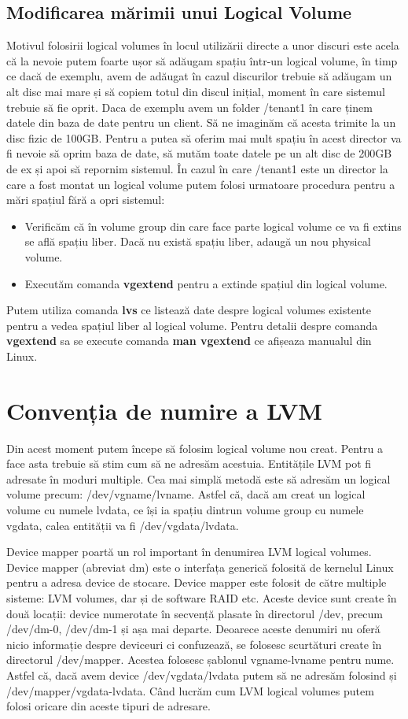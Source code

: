 \subsection{Modificarea mărimii unui Logical Volume}
Motivul folosirii logical volumes în locul utilizării directe a unor discuri este acela că la nevoie putem foarte ușor să adăugam spațiu într-un logical volume, în timp ce dacă de exemplu, avem de adăugat în cazul discurilor trebuie să adăugam un alt disc mai mare și să copiem totul din discul inițial, moment în care sistemul trebuie să fie oprit. Daca de exemplu avem un folder /tenant1 în care ținem datele din baza de date pentru un client. Să ne imaginăm că acesta trimite la un disc fizic de 100GB. Pentru a putea să oferim mai mult spațiu în acest director va fi nevoie să oprim baza de date, să mutăm toate datele pe un alt disc de 200GB de ex și apoi să repornim sistemul. În cazul în care /tenant1 este un director la care a fost montat un logical volume putem folosi urmatoare procedura pentru a mări spațiul fără a opri sistemul:
\begin{itemize}
\item Verificăm că în volume group din care face parte logical volume ce va fi extins se află spațiu liber. Dacă nu există spațiu liber, adaugă un nou physical volume.
\item Executăm comanda \textbf{vgextend} pentru a extinde spațiul din logical volume.
\end{itemize}
Putem utiliza comanda \textbf{lvs} ce listează date despre logical volumes existente pentru a vedea spațiul liber al logical volume. Pentru detalii despre comanda \textbf{vgextend} sa se execute comanda \textbf{man vgextend} ce afișeaza manualul din Linux.
\newpage
\section{Convenția de numire a LVM}
Din acest moment putem începe să folosim logical volume nou creat. Pentru a face asta trebuie să stim cum să ne adresăm acestuia. Entitățile LVM pot fi adresate în moduri multiple. Cea mai simplă metodă este să adresăm un logical volume precum: /dev/vgname/lvname. Astfel că, dacă am creat un logical volume cu numele lvdata, ce își ia spațiu dintrun volume group cu numele vgdata, calea entității va fi /dev/vgdata/lvdata.
\par
Device mapper poartă un rol important în denumirea LVM logical volumes. Device mapper (abreviat dm) este o interfața generică folosită de kernelul Linux pentru a adresa device de stocare. Device mapper este folosit de către multiple sisteme: LVM volumes, dar și de software RAID etc. Aceste device sunt create în două locații: device numerotate în secvență plasate în directorul /dev, precum /dev/dm-0, /dev/dm-1 și așa mai departe. Deoarece aceste denumiri nu oferă nicio informație despre deviceuri ci confuzează, se folosesc scurtături create în directorul /dev/mapper. Acestea folosesc șablonul vgname-lvname pentru nume. Astfel că, dacă avem device /dev/vgdata/lvdata putem să ne adresăm folosind și /dev/mapper/vgdata-lvdata. Când lucrăm cum LVM logical volumes putem folosi oricare din aceste tipuri de adresare.